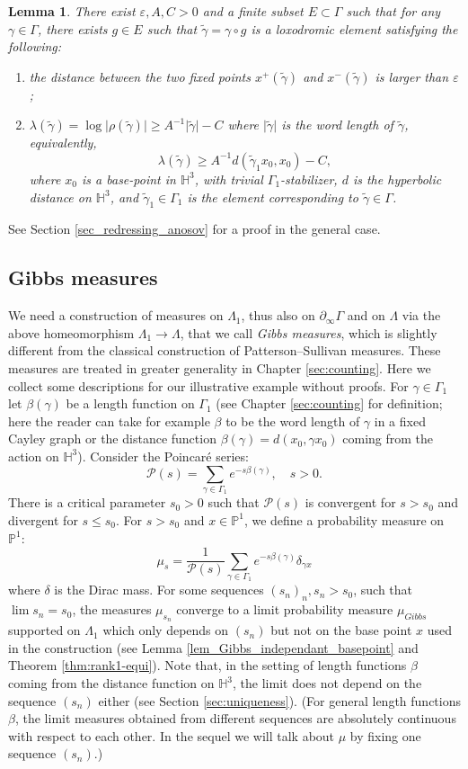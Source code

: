 \documentclass[12pt]{amsbook}%
\newtheorem{lem}[thm]{Lemma}
\theoremstyle{definition}
\theoremstyle{remark}
\numberwithin{section}{chapter}
\numberwithin{subsection}{section}
\numberwithin{figure}{chapter}
\def\dyl{>0}
\def\bH{{\mathbb{H}}}
\def\bP{{\mathbb{P}}}
\def\cP{{\mathscr{P}}}
\def\tga{{\tilde{\gamma}}}
\def\Ga{\Gamma}
\def\ga{\gamma}
\def\La{\Lambda}
\def\la{\lambda}
\def\geo{\partial_\infty}
\begin{document}
{{\begin{lem}\label{ill_statement_one}
There exist $\varepsilon,A,C\dyl$ and a finite subset $E\subset \Gamma$ such that for any $\gamma\in \Gamma$, there exists $g\in E$ such that 
$\tga=\gamma\circ g$ is a loxodromic element satisfying the following:
\begin{enumerate}
\item the distance between the two fixed points $x^+(\tga)$ and $x^-(\tga)$ is larger than $\varepsilon$;
\item $\la(\tilde\ga)= \log \lvert\rho(\tga)\rvert\geqslant A^{-1}\lvert \tga \rvert -C$ where $\lvert \tga\rvert$ is the word length of $\tga$, equivalently, 
$$
\lambda(\tga)\geqslant A^{-1} d(\tga_1 x_0, x_0)  -C,
$$
where $x_0$ is a base-point in $\bH^3$, with trivial $\Ga_1$-stabilizer, $d$ is the hyperbolic distance on $\bH^3$, and 
$\tga_1\in \Ga_1$ is the element corresponding to $\tga\in \Ga$. 
\end{enumerate}
\end{lem}
See Section \ref{sec_redressing_anosov} for a proof in the general case. 

\subsection{Gibbs measures}

We need a construction of measures on $\Lambda_1$, thus also on $\geo \Gamma$ and on $\Lambda$ via the above homeomorphism $\La_1\to\La$, that we call {\em Gibbs measures}, which is slightly different from the classical construction of Patterson--Sullivan measures. These measures are treated in greater generality in Chapter \ref{sec:counting}. Here we collect some descriptions for our illustrative example without proofs. For $\ga\in\Ga_1$ let $\beta(\ga)$ be a length function on $\Ga_1$ (see Chapter \ref{sec:counting} for definition; here the reader can take for example $\beta$ to be the word length of $\ga$ in a fixed Cayley graph or the distance function $\beta(\gamma)=d(x_0, \gamma x_0)$ coming from the action on $\bH^3$). Consider the Poincar\'e series:
\[\cP(s)=\sum_{\ga\in \Gamma_1}e^{-s \beta(\ga)}, \quad s>0.\]
There is a critical parameter $s_0\dyl$ such that $\cP(s)$ is convergent for $s>s_0$ and divergent for $s\leqslant s_0$. For $s>s_0$ and $x\in \bP^1$, we define a probability measure on $\bP^1$:
\[\mu_s=\frac{1}{\cP(s)}\sum_{\ga\in \Gamma_1}e^{-s\beta(\ga)}\delta_{\ga x}\]
where $\delta$ is the Dirac mass. For some sequences $(s_n)_n, s_n> s_0$, such that $\lim s_n=s_0$, the measures $\mu_{s_n}$ converge to a limit probability measure $\mu_{Gibbs}$ supported on $\Lambda_1$ which only depends on $(s_n)$ but not on the base point $x$ used in the construction (see Lemma \ref{lem_Gibbs_independant_basepoint} and Theorem \ref{thm:rank1-equi}). Note that, in the setting of length functions $\beta$ coming from the distance function on $\bH^3$, the limit does not depend on the sequence $(s_n)$ either  (see Section \ref{sec:uniqueness}). (For general length functions $\beta$, the limit measures obtained from different sequences are absolutely continuous with respect to each other. In the sequel we will talk about $\mu$ by fixing one sequence $(s_n)$.) 


}}
\end{document}
